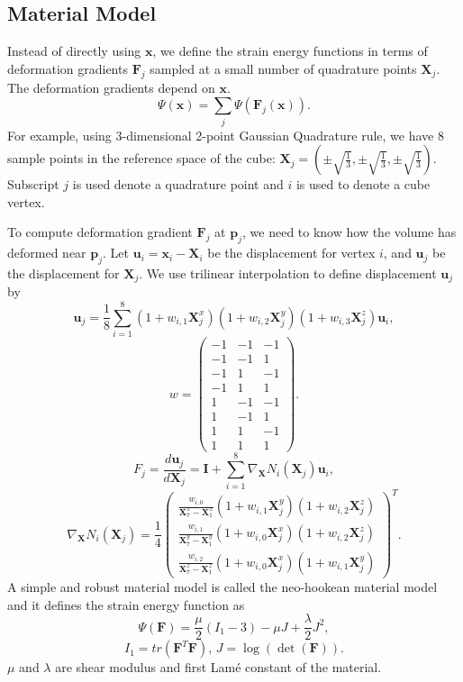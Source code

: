 \documentclass{article}
\newcommand{\mbF}{\mathbf{F}}
\newcommand{\mbI}{\mathbf{I}}
\newcommand{\mbp}{\mathbf{p}}
\newcommand{\mbX}{\mathbf{X}}
\newcommand{\mbx}{\mathbf{x}}
\newcommand{\mbu}{\mathbf{u}}
\begin{document}
	\subsection{Material Model}
	Instead of directly using $\mbx$, 
	we define the strain energy functions in terms of deformation gradients $\mbF_j$
	sampled at a small number of quadrature points $\mbX_j$. The deformation gradients
	depend on $\mbx$.
	\[\Psi(\mbx) = \sum_j \Psi(\mbF_j(\mbx)).\]
	For example, using 3-dimensional
	2-point Gaussian Quadrature rule, we have $8$ sample points in the reference space of the cube:
	$\mbX_j=(\pm\sqrt{\frac{1}{3}}, \pm\sqrt{\frac{1}{3}},\pm\sqrt{\frac{1}{3}})$. Subscript $j$ is used
	denote a quadrature point and $i$ is used to denote a cube vertex.
	
	To compute deformation gradient $\mbF_j$ at $\mbp_j$, we need to know how the volume has deformed
	near $\mbp_j$. Let $\mbu_i=\mbx_i-\mbX_i$ be the displacement for vertex $i$, and $\mbu_j$
	be the displacement for $\mbX_j$.
	We use trilinear interpolation to define displacement $\mbu_j$ by
	\[\mbu_j=\frac{1}{8}\sum_{i=1}^8(1+w_{i,1}\mbX_j^x)(1+w_{i,2}\mbX_j^y)(1+w_{i,3}\mbX_j^z)\mbu_i,\]
	\[
	w=\begin{pmatrix}
	-1 & -1 & -1\\
	-1 & -1 & 1\\
	-1 & 1 & -1\\
	-1 & 1 & 1\\
	1 & -1 & -1\\
	1 & -1 & 1\\
	1 & 1 & -1\\
	1 & 1 & 1
	\end{pmatrix}.
	\]
	\[
	F_j=\frac{d\mbu_j}{d\mbX_j} = \mbI + \sum_{i=1}^8\nabla_{\mbX} N_i(\mbX_j)\mbu_i,
	\]
	\[
	\nabla_{\mbX}N_i(\mbX_j) = \frac{1}{4}
	\begin{pmatrix}
	\frac{w_{i,0}}{\mbX_7^x-\mbX_1^x}(1+w_{i,1}\mbX_j^y)(1+w_{i,2}\mbX_j^z)\\
	\frac{w_{i,1}}{\mbX_7^y-\mbX_1^y}(1+w_{i,0}\mbX_j^x)(1+w_{i,2}\mbX_j^z)\\
	\frac{w_{i,2}}{\mbX_7^z-\mbX_1^z}(1+w_{i,0}\mbX_j^x)(1+w_{i,1}\mbX_j^y)
	\end{pmatrix}^T.
	\]
	A simple and robust material model is called the neo-hookean material
	model and it defines the strain energy function as
	\[
	\Psi(\mbF)=\frac{\mu}{2}(I_1-3) - \mu J + \frac{\lambda}{2}J^2,
	\]
	\[I_1=tr(\mbF^T\mbF),\, J=\log(\det(\mbF)).
	\]
	$\mu$ and $\lambda$ are shear modulus and first Lam\'{e} constant of the material.
\end{document}
